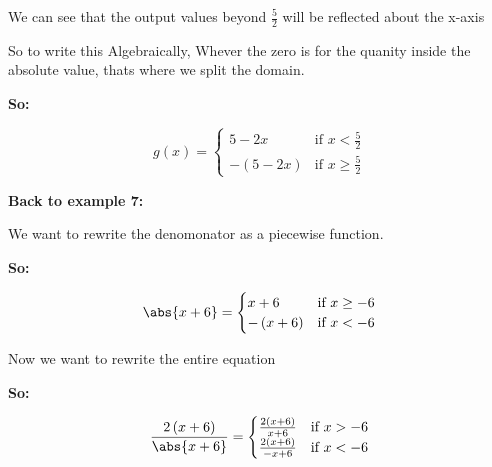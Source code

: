 \documentclass{report}
\begin{document}
    \bigbreak \noindent \bigbreak \noindent
    We can see that the output values beyond $\frac{5}{2}$ will be reflected about the x-axis
    
    \bigbreak \noindent 
    So to write this Algebraically, Whever the zero is for the quanity inside the absolute value, 
    thats where we split the domain.

    \bigbreak \noindent 
    \textbf{So:}

    \bigbreak \noindent 
       \begin{equation}
        g(x)=
            \begin{cases}
                5-2x  & \text{if } x < \displaystyle{\frac{5}{2}} \\ 
                - \left(5-2x\right)      & \text{if } \displaystyle{ x \geq \frac{5}{2}} 
            \end{cases}
        \end{equation}

        \bigbreak \noindent 
        \begin{large}
           \textbf{Back to example 7:} 
        \end{large}
        
        \bigbreak \noindent 
        We want to rewrite the denomonator as a piecewise function.

        \bigbreak \noindent 
        \textbf{So:}

        \bigbreak \noindent 
           \begin{equation}
           \abs{x+6}=
                \begin{cases}
                    x+6 & \text{if } x \geq -6 \\ 
                    - \left(x+6\right) & \text{if } x < -6 
                \end{cases}
            \end{equation}

        \bigbreak \noindent 
        Now we want to rewrite the entire equation

        \bigbreak \noindent 
        \textbf{So:}

           \begin{equation}
               \frac{2 \left(x+6\right)}{\abs{x+6}}=
                \begin{cases}
                    \frac{2 \left(x+6\right)}{x+6} & \text{if } x > -6 \\ 
                    \frac{2 \left(x+6\right)}{-x+6} & \text{if } x < -6 
                \end{cases}
            \end{equation}
\end{document}
